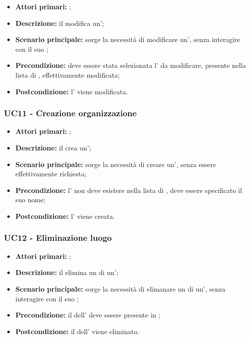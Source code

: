 \documentclass[../analisi-dei-requisiti]{subfiles}
\begin{document}
\begin{itemize}
  \item \textbf{Attori primari:} ;
  \item \textbf{Descrizione:} il  modifica un';
  \item \textbf{Scenario principale:} sorge la necessità di modificare un', senza interagire con il suo ;
  \item \textbf{Precondizione:} deve essere stata selezionata l' da modificare, presente nella lista di , effettivamente modificata;
  \item \textbf{Postcondizione:} l' viene modificata.

\end{itemize}


\subsubsection{UC11 - Creazione organizzazione}
\label{subsub:UC11}

\begin{itemize}
  \item \textbf{Attori primari:} ;
  \item \textbf{Descrizione:} il  crea un';
  \item \textbf{Scenario principale:} sorge la necessità di creare un', senza essere effettivamente richiesta;
  \item \textbf{Precondizione:} l' non deve esistere nella lista di , deve essere specificato il suo nome;
  \item \textbf{Postcondizione:} l' viene creata.

\end{itemize}

\subsubsection{UC12 - Eliminazione luogo}
\label{subsub:UC12}

\begin{itemize}
  \item \textbf{Attori primari:} ;
  \item \textbf{Descrizione:} il  elimina un  di un';
  \item \textbf{Scenario principale:} sorge la necessità di elimanare un  di un', senza interagire con il suo ;
  \item \textbf{Precondizione:} il  dell' deve essere presente in ;
  \item \textbf{Postcondizione:} il  dell' viene eliminato.

\end{itemize}
\end{document}
